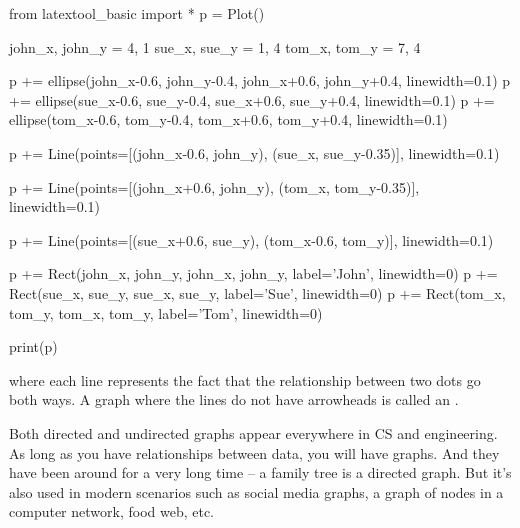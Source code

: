 \begin{python}
from latextool_basic import *
p = Plot()

john_x, john_y = 4, 1
sue_x, sue_y = 1, 4
tom_x, tom_y = 7, 4

p += ellipse(john_x-0.6, john_y-0.4, john_x+0.6, john_y+0.4, linewidth=0.1)
p += ellipse(sue_x-0.6, sue_y-0.4, sue_x+0.6, sue_y+0.4, linewidth=0.1)
p += ellipse(tom_x-0.6, tom_y-0.4, tom_x+0.6, tom_y+0.4, linewidth=0.1)

p += Line(points=[(john_x-0.6, john_y), (sue_x, sue_y-0.35)], linewidth=0.1)

p += Line(points=[(john_x+0.6, john_y), (tom_x, tom_y-0.35)], linewidth=0.1)

p += Line(points=[(sue_x+0.6, sue_y), (tom_x-0.6, tom_y)], linewidth=0.1)

p += Rect(john_x, john_y, john_x, john_y, label='John', linewidth=0)
p += Rect(sue_x, sue_y, sue_x, sue_y, label='Sue', linewidth=0)
p += Rect(tom_x, tom_y, tom_x, tom_y, label='Tom', linewidth=0)

print(p)
\end{python}

where each line represents the fact that the relationship between two dots go both ways. A graph where the lines do not have arrowheads is called an .

Both directed and undirected graphs appear everywhere in CS and engineering. As long as you have relationships between data, you will have graphs. And they have been around for a very long time -- a family tree is a directed graph. But it's also used in modern scenarios such as social media graphs, a graph of nodes in a computer network, food web, etc.

